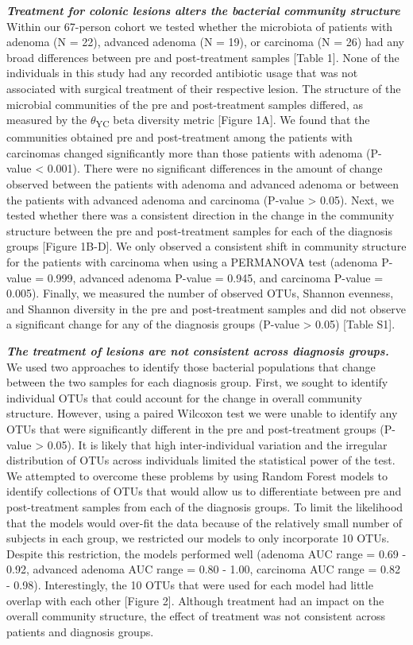 \documentclass[12pt,]{article}
\begin{document}
\textbf{\emph{Treatment for colonic lesions alters the bacterial
community structure}} Within our 67-person cohort we tested whether the
microbiota of patients with adenoma (N = 22), advanced adenoma (N = 19),
or carcinoma (N = 26) had any broad differences between pre and
post-treatment samples {[}Table 1{]}. None of the individuals in this
study had any recorded antibiotic usage that was not associated with
surgical treatment of their respective lesion. The structure of the
microbial communities of the pre and post-treatment samples differed, as
measured by the \(\theta\)\textsubscript{YC} beta diversity metric
{[}Figure 1A{]}. We found that the communities obtained pre and
post-treatment among the patients with carcinomas changed significantly
more than those patients with adenoma (P-value \textless{} 0.001). There
were no significant differences in the amount of change observed between
the patients with adenoma and advanced adenoma or between the patients
with advanced adenoma and carcinoma (P-value \textgreater{} 0.05). Next,
we tested whether there was a consistent direction in the change in the
community structure between the pre and post-treatment samples for each
of the diagnosis groups {[}Figure 1B-D{]}. We only observed a consistent
shift in community structure for the patients with carcinoma when using
a PERMANOVA test (adenoma P-value = 0.999, advanced adenoma P-value =
0.945, and carcinoma P-value = 0.005). Finally, we measured the number
of observed OTUs, Shannon evenness, and Shannon diversity in the pre and
post-treatment samples and did not observe a significant change for any
of the diagnosis groups (P-value \textgreater{} 0.05) {[}Table S1{]}.

\textbf{\emph{The treatment of lesions are not consistent across
diagnosis groups.}} We used two approaches to identify those bacterial
populations that change between the two samples for each diagnosis
group. First, we sought to identify individual OTUs that could account
for the change in overall community structure. However, using a paired
Wilcoxon test we were unable to identify any OTUs that were
significantly different in the pre and post-treatment groups (P-value
\textgreater{} 0.05). It is likely that high inter-individual variation
and the irregular distribution of OTUs across individuals limited the
statistical power of the test. We attempted to overcome these problems
by using Random Forest models to identify collections of OTUs that would
allow us to differentiate between pre and post-treatment samples from
each of the diagnosis groups. To limit the likelihood that the models
would over-fit the data because of the relatively small number of
subjects in each group, we restricted our models to only incorporate 10
OTUs. Despite this restriction, the models performed well (adenoma AUC
range = 0.69 - 0.92, advanced adenoma AUC range = 0.80 - 1.00, carcinoma
AUC range = 0.82 - 0.98). Interestingly, the 10 OTUs that were used for
each model had little overlap with each other {[}Figure 2{]}. Although
treatment had an impact on the overall community structure, the effect
of treatment was not consistent across patients and diagnosis groups.
\end{document}
